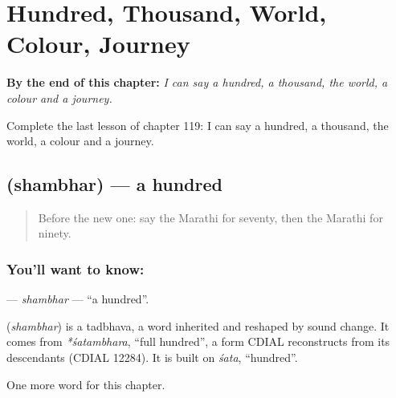 
\chapter{Hundred, Thousand, World, Colour, Journey}
\label{ch:mr-hundred-thousand-world-colour-journey}

\begin{chapteropening}
\textbf{By the end of this chapter:} \emph{I can say a hundred, a thousand, the world, a colour and a journey.}

Complete the last lesson of chapter 119: I can say a hundred, a thousand, the world, a colour and a journey.
\end{chapteropening}

\section[\texorpdfstring{\mr{शंभर} (shambhar)}{शंभर (shambhar)}]{ (shambhar) — a hundred}

\label{lesson:MR-C119-shambhar}



\begin{quote}
Before the new one: say the Marathi for seventy, then the Marathi for ninety.
\end{quote}

\subsection*{You'll want to know: }
\textbf{} — \emph{shambhar} — \textquotedblleft{}a hundred\textquotedblright{}.

\begin{cousinweb}
\textbf{} (\emph{shambhar}) is a tadbhava, a word inherited and reshaped by sound change. It comes from \emph{*śatambhara}, \textquotedblleft{}full hundred\textquotedblright{}, a form CDIAL reconstructs from its descendants (CDIAL 12284). It is built on \emph{śata}, \textquotedblleft{}hundred\textquotedblright{}.
\end{cousinweb}

\begin{grammarlens}[title={What you've built}]
One more word for this chapter.
\end{grammarlens}

